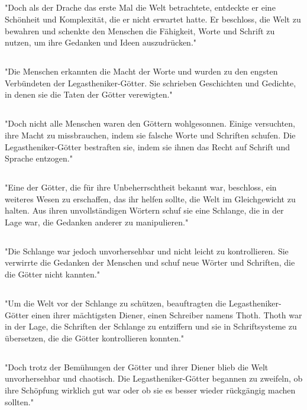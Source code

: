 \documentclass{article}
\begin{document}
\subsection{}
"Doch als der Drache das erste Mal die Welt betrachtete, entdeckte er eine Schönheit und Komplexität, die er nicht erwartet hatte. Er beschloss, die Welt zu bewahren und schenkte den Menschen die Fähigkeit, Worte und Schrift zu nutzen, um ihre Gedanken und Ideen auszudrücken."
\subsection{}
"Die Menschen erkannten die Macht der Worte und wurden zu den engsten Verbündeten der Legastheniker-Götter. Sie schrieben Geschichten und Gedichte, in denen sie die Taten der Götter verewigten."
\subsection{}
"Doch nicht alle Menschen waren den Göttern wohlgesonnen. Einige versuchten, ihre Macht zu missbrauchen, indem sie falsche Worte und Schriften schufen. Die Legastheniker-Götter bestraften sie, indem sie ihnen das Recht auf Schrift und Sprache entzogen."
\subsection{}
"Eine der Götter, die für ihre Unbeherrschtheit bekannt war, beschloss, ein weiteres Wesen zu erschaffen, das ihr helfen sollte, die Welt im Gleichgewicht zu halten. Aus ihren unvollständigen Wörtern schuf sie eine Schlange, die in der Lage war, die Gedanken anderer zu manipulieren."
\subsection{}
"Die Schlange war jedoch unvorhersehbar und nicht leicht zu kontrollieren. Sie verwirrte die Gedanken der Menschen und schuf neue Wörter und Schriften, die die Götter nicht kannten."
\subsection{}
"Um die Welt vor der Schlange zu schützen, beauftragten die Legastheniker-Götter einen ihrer mächtigsten Diener, einen Schreiber namens Thoth. Thoth war in der Lage, die Schriften der Schlange zu entziffern und sie in Schriftsysteme zu übersetzen, die die Götter kontrollieren konnten."
\subsection{}
"Doch trotz der Bemühungen der Götter und ihrer Diener blieb die Welt unvorhersehbar und chaotisch. Die Legastheniker-Götter begannen zu zweifeln, ob ihre Schöpfung wirklich gut war oder ob sie es besser wieder rückgängig machen sollten."
\end{document}
